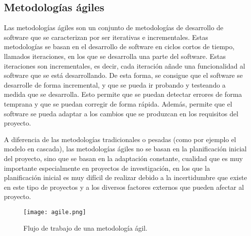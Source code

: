 \subsection{Metodologías ágiles}
Las metodologías ágiles son un conjunto de metodologías de desarrollo de software
que se caracterizan por ser iterativas e incrementales. Estas metodologías se
basan en el desarrollo de software en ciclos cortos de tiempo, llamados
iteraciones, en los que se desarrolla una parte del software. Estas iteraciones
son incrementales, es decir, cada iteración añade una funcionalidad al software
que se está desarrollando. De esta forma, se consigue que el software se
desarrolle de forma incremental, y que se pueda ir probando y testeando a medida
que se desarrolla. Esto permite que se puedan detectar errores de forma temprana
y que se puedan corregir de forma rápida. Además, permite que el software se
pueda adaptar a los cambios que se produzcan en los requisitos del proyecto.\medskip

A diferencia de las metodologías tradicionales o pesadas \cite{Jose_1634898355000} 
(como por ejemplo el modelo en cascada), las metodologías ágiles no se basan en la planificación
inicial del proyecto, sino que se basan en la adaptación constante, cualidad
que es muy importante especialmente en proyectos de investigación, en los que
la planificación inicial es muy difícil de realizar debido a la incertidumbre
que existe en este tipo de proyectos y a los diversos factores externos que
pueden afectar al proyecto.

\begin{figure}[ht]
    \centering
    \texttt{[image: agile.png]}
    \caption{Flujo de trabajo de una metodología ágil.}
    \label{fig:agile}
\end{figure}
